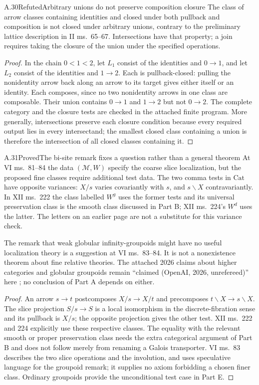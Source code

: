 \begin{claim}{A.30}{Refuted}{Arbitrary unions do not preserve composition closure}
The class of arrow classes containing identities and closed under both pullback and composition is not closed under arbitrary unions, contrary to the preliminary lattice description in II ms.~65--67. Intersections have that property; a join requires taking the closure of the union under the specified operations.
\end{claim}
\begin{proof}
In the chain $0<1<2$, let $L_1$ consist of the identities and $0\to1$, and let $L_2$ consist of the identities and $1\to2$. Each is pullback-closed: pulling the nonidentity arrow back along an arrow to its target gives either itself or an identity. Each composes, since no two nonidentity arrows in one class are composable. Their union contains $0\to1$ and $1\to2$ but not $0\to2$. The complete category and the closure tests are checked in the attached finite program. More generally, intersections preserve each closure condition because every required output lies in every intersectand; the smallest closed class containing a union is therefore the intersection of all closed classes containing it.
\end{proof}

\begin{claim}{A.31}{Proved}{The bi-site remark fixes a question rather than a general theorem}
At VI ms.~81--84 the data $(\mathcal M,W)$ specify the coarse slice localization, but the proposed fine classes require additional test data. The two comma tests in $\mathrm{Cat}$ have opposite variances: $X/s$ varies covariantly with $s$, and $s\backslash X$ contravariantly. In XII ms.~222 the class labelled $W^g$ uses the former tests and its universal preservation class is the smooth class discussed in Part B; XII ms.~224's $W^d$ uses the latter. The letters on an earlier page are not a substitute for this variance check.

The remark that weak globular infinity-groupoids might have no useful localization theory is a suggestion at VI ms.~83--84. It is not a nonexistence theorem about fine relative theories. The attached 2026 claims about higher categories and globular groupoids remain ``claimed (OpenAI, 2026, unrefereed)'' here \citep{OpenAI2026Thomason,OpenAI2026Groupoids}; no conclusion of Part A depends on either.
\end{claim}
\begin{proof}
An arrow $s\to t$ postcomposes $X/s\to X/t$ and precomposes $t\backslash X\to s\backslash X$. The slice projection $S/s\to S$ is a local isomorphism in the discrete-fibration sense and its pullback is $X/s$; the opposite projection gives the other test. XII ms.~222 and 224 explicitly use these respective classes. The equality with the relevant smooth or proper preservation class needs the extra categorical argument of Part B and does not follow merely from renaming a Galois transporter. VI ms.~83 describes the two slice operations and the involution, and uses speculative language for the groupoid remark; it supplies no axiom forbidding a chosen finer class. Ordinary groupoids provide the unconditional test case in Part E.
\end{proof}

